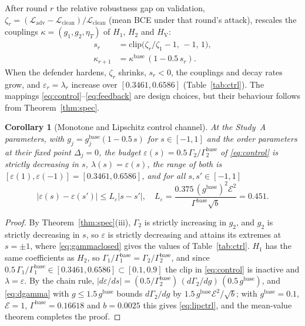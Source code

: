 \documentclass[conference]{IEEEtran}
\newtheorem{corollary}{Corollary}
\newcommand{\cL}{\mathcal{L}}
\newcommand{\cE}{\mathcal{E}}
\newcommand{\HV}{H_{\mathrm{V}}}
\begin{document}
After round $r$ the relative robustness gap on validation, $\zeta_r=(\cL_{\mathrm{adv}}-\cL_{\mathrm{clean}})/\cL_{\mathrm{clean}}$ (mean BCE under that round's attack), rescales the couplings $\kappa=(g_1,g_2,\eta_T)$ of $H_1$, $H_2$ and $\HV$:
\begin{equation}
\begin{aligned}
s_r&=\mathrm{clip}\big(\zeta_r/\zeta_1-1,\,-1,\,1\big),\\
\kappa_{r+1}&=\kappa^{\mathrm{base}}\,(1-0.5\,s_r).
\end{aligned}
\label{eq:feedback}
\end{equation}
When the defender hardens, $\zeta_r$ shrinks, $s_r<0$, the couplings and decay rates grow, and $\varepsilon_r=\lambda_r$ increase over $[0.3461,0.6586]$ (Table~\ref{tab:ctrl}). The mappings \eqref{eq:control}--\eqref{eq:feedback} are design choices, but their behaviour follows from Theorem~\ref{thm:spec}.

\begin{corollary}[Monotone and Lipschitz control channel]\label{cor:ctrl}
At the Study~A parameters, with $g_j=g_j^{\mathrm{base}}(1-0.5\,s)$ for $s\in[-1,1]$ and the order parameters at their fixed point $\Delta_j=0$, the budget $\varepsilon(s)=0.5\,\Gamma_2/\Gamma_2^{\mathrm{base}}$ of \eqref{eq:control} is strictly decreasing in $s$, $\lambda(s)=\varepsilon(s)$, the range of both is $[\varepsilon(1),\varepsilon(-1)]=[0.3461,0.6586]$, and for all $s,s'\in[-1,1]$
\begin{equation}
|\varepsilon(s)-\varepsilon(s')|\le L_\varepsilon|s-s'|,\quad L_\varepsilon=\frac{0.375\,(g^{\mathrm{base}})^2\cE^2}{\Gamma^{\mathrm{base}}\sqrt b}=0.451.
\label{eq:lipctrl}
\end{equation}
\end{corollary}

\begin{proof}
By Theorem~\ref{thm:spec}(iii), $\Gamma_2$ is strictly increasing in $g_2$, and $g_2$ is strictly decreasing in $s$, so $\varepsilon$ is strictly decreasing and attains its extremes at $s=\pm1$, where \eqref{eq:gammaclosed} gives the values of Table~\ref{tab:ctrl}. $H_1$ has the same coefficients as $H_2$, so $\Gamma_1/\Gamma_1^{\mathrm{base}}=\Gamma_2/\Gamma_2^{\mathrm{base}}$, and since $0.5\,\Gamma_1/\Gamma_1^{\mathrm{base}}\in[0.3461,0.6586]\subset[0.1,0.9]$ the clip in \eqref{eq:control} is inactive and $\lambda=\varepsilon$. By the chain rule, $|d\varepsilon/ds|=(0.5/\Gamma_2^{\mathrm{base}})\,(d\Gamma_2/dg)\,(0.5\,g^{\mathrm{base}})$, and \eqref{eq:dgamma} with $g\le1.5\,g^{\mathrm{base}}$ bounds $d\Gamma_2/dg$ by $1.5\,g^{\mathrm{base}}\cE^2/\sqrt b$; with $g^{\mathrm{base}}=0.1$, $\cE=1$, $\Gamma^{\mathrm{base}}=0.16618$ and $b=0.0025$ this gives \eqref{eq:lipctrl}, and the mean-value theorem completes the proof.
\end{proof}
\end{document}
